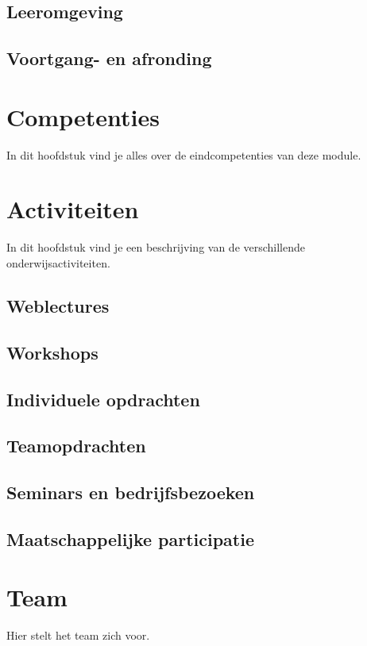 \documentclass[]{book}
\begin{document}
\section{Leeromgeving}\label{leeromgeving}

\section{Voortgang- en afronding}\label{voortgang--en-afronding}

\chapter{Competenties}\label{competenties}

In dit hoofdstuk vind je alles over de eindcompetenties van deze module.

\chapter{Activiteiten}\label{activiteiten}

In dit hoofdstuk vind je een beschrijving van de verschillende
onderwijsactiviteiten.

\section{Weblectures}\label{weblectures}

\section{Workshops}\label{workshops}

\section{Individuele opdrachten}\label{individuele-opdrachten}

\section{Teamopdrachten}\label{teamopdrachten}

\section{Seminars en
bedrijfsbezoeken}\label{seminars-en-bedrijfsbezoeken}

\section{Maatschappelijke
participatie}\label{maatschappelijke-participatie}

\chapter{Team}\label{team}

Hier stelt het team zich voor.


\end{document}
